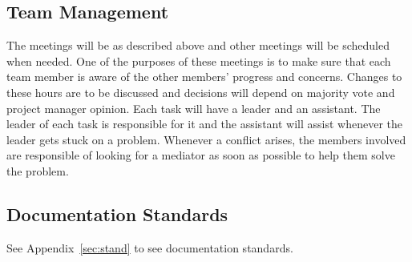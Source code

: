 \subsection{Team Management}

The meetings will be as described above and other meetings will be scheduled
when needed. One of the purposes of these meetings is to make sure that each
team member is aware of the other members' progress and concerns. Changes to
these hours are to be discussed and decisions will depend on majority vote and
project manager opinion. Each task will have a leader and an assistant. The leader
of each task is responsible for it and the assistant will assist whenever the
leader gets stuck on a problem. Whenever a conflict arises, the members involved
are responsible of looking for a mediator as soon as possible to help them
solve the problem.

\subsection{Documentation Standards}
See Appendix~\ref{sec:stand} to see documentation standards.